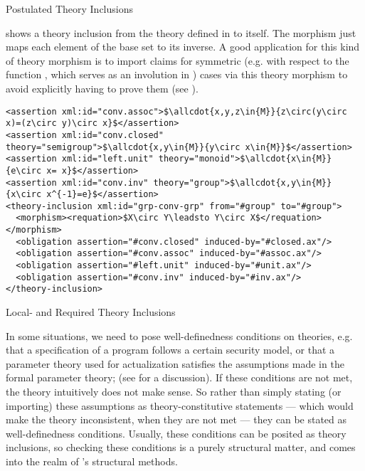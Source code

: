 \begin{omgroup}[id=complex-theories,short=Complex Theories,
                            creators=miko,contributors=frabe]
\begin{omgroup}[id=theory-inclusions]{Postulated Theory Inclusions}
\begin{module}[id=theory-morphisms]
{} shows a theory inclusion from the theory {}
defined in {} to itself. The morphism just maps each element of the
base set to its inverse. A good application for this kind of theory morphism is to import
claims for symmetric (e.g. with respect to the function {}, which serves as
an involution in {}) cases via this theory morphism to avoid explicitly
having to prove them (see {}).

\begin{lstlisting}[label=lst:theory-inclusion,mathescape,
  caption={A Theory Inclusion for Groups},
  index={theory-inclusion,morphism,requation,assertion}]
<assertion xml:id="conv.assoc">$\allcdot{x,y,z\in{M}}{z\circ(y\circ x)=(z\circ y)\circ x}$</assertion>
<assertion xml:id="conv.closed" theory="semigroup">$\allcdot{x,y\in{M}}{y\circ x\in{M}}$</assertion>
<assertion xml:id="left.unit" theory="monoid">$\allcdot{x\in{M}}{e\circ x= x}$</assertion>
<assertion xml:id="conv.inv" theory="group">$\allcdot{x,y\in{M}}{x\circ x^{-1}=e}$</assertion>
<theory-inclusion xml:id="grp-conv-grp" from="#group" to="#group">
  <morphism><requation>$X\circ Y\leadsto Y\circ X$</requation></morphism>
  <obligation assertion="#conv.closed" induced-by="#closed.ax"/>
  <obligation assertion="#conv.assoc" induced-by="#assoc.ax"/>
  <obligation assertion="#left.unit" induced-by="#unit.ax"/>
  <obligation assertion="#conv.inv" induced-by="#inv.ax"/>
</theory-inclusion>  
\end{lstlisting}
\end{module}
\end{omgroup}

\begin{omgroup}[id=restricting-inference,short=Local/Required Theory Inclusions]{Local- and
  Required Theory Inclusions}
\begin{module}[id=restinf]

In some situations, we need to pose well-definedness conditions on theories, e.g. that a
specification of a program follows a certain security model, or that a parameter theory
used for actualization satisfies the assumptions made in the formal parameter theory; (see
{} for a discussion). If these conditions are not met, the theory
intuitively does not make sense. So rather than simply stating (or importing) these
assumptions as theory-constitutive statements --- which would make the theory
inconsistent, when they are not met --- they can be stated as well-definedness
conditions. Usually, these conditions can be posited as theory inclusions, so checking
these conditions is a purely structural matter, and comes into the realm of {\omdoc}'s
structural methods.


\end{module}
\end{omgroup}
\end{omgroup}
